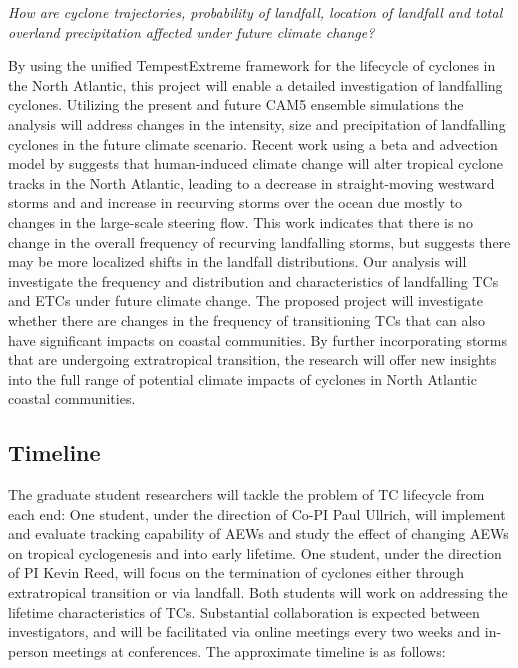 \documentclass[11pt]{article}
\begin{document}
\emph{How are cyclone trajectories, probability of landfall, location of landfall and total overland precipitation affected under future climate change?}

By using the unified TempestExtreme framework for the lifecycle of cyclones in the North Atlantic, this project will enable a detailed investigation of landfalling cyclones.  Utilizing the present and future CAM5 ensemble simulations the analysis will address changes in the intensity, size and precipitation of landfalling cyclones in the future climate scenario. Recent work using a beta and advection model by \citet{Colbert2013} suggests that human-induced climate change will alter tropical cyclone tracks in the North Atlantic, leading to a decrease in straight-moving westward storms and and increase in recurving storms over the ocean due mostly to changes in the large-scale steering flow.  This work indicates that there is no change in the overall frequency of recurving landfalling storms, but suggests there may be more localized shifts in the landfall distributions. Our analysis will investigate the frequency and distribution and characteristics of landfalling TCs and ETCs under future climate change. The proposed project will investigate whether there are changes in the frequency of transitioning TCs that can also have significant impacts on coastal communities.  By further incorporating storms that are undergoing extratropical transition, the research will offer new insights into the full range of potential climate impacts of cyclones in North Atlantic coastal communities.

\subsection{Timeline} \label{sec:Timeline}

The graduate student researchers will tackle the problem of TC lifecycle from each end:  One student, under the direction of Co-PI Paul Ullrich, will implement and evaluate tracking capability of AEWs and study the effect of changing AEWs on tropical cyclogenesis and into early lifetime.  One student, under the direction of PI Kevin Reed, will focus on the termination of cyclones either through extratropical transition or via landfall.  Both students will work on addressing the lifetime characteristics of TCs.  Substantial collaboration is expected between investigators, and will be facilitated via online meetings every two weeks and in-person meetings at conferences.  The approximate timeline is as follows:
\end{document}
